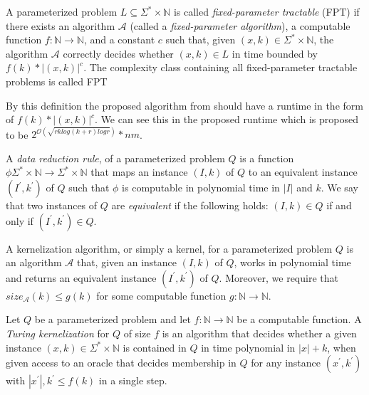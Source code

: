\documentclass[a4paper]{article}
\begin{document}
\begin{theoremdefinition}{\cite[p.~13]{param_algo_book}}
    A parameterized problem $L \subseteq \Sigma^* \times \mathbb{N}$ is called
    \textit{fixed-parameter tractable} (FPT) if there exists an algorithm $\mathcal{A}$ (called
    a \textit{fixed-parameter algorithm}), a computable function $f:\mathbb{N} \rightarrow \mathbb{N}$,
    and a constant $c$ such that, given $(x,k) \in \Sigma^* \times \mathbb{N}$, the algorithm
    $\mathcal{A}$ correctly decides whether $(x,k) \in L$ in time bounded by $f(k) * |(x,k)|^c$.
    The complexity class containing all fixed-parameter tractable problems is called FPT
\end{theoremdefinition}

By this definition the proposed algorithm from \cite{fomin_golovach_panolan_2020} should have
a runtime in the form of $f(k) * |(x,k)|^c$. We can see this in the proposed runtime which is
proposed to be $2^{\mathcal{O} (\sqrt{rk log(k+r) logr})}*nm$.

\begin{theoremdefinition}{\cite[p.~18]{param_algo_book}}
    A \textit{data reduction rule}, of a parameterized problem $Q$ is a function
    $\phi \Sigma^* \times \mathbb{N} \rightarrow \Sigma^* \times \mathbb{N}$
    that maps an instance $(I,k)$ of $Q$ to an equivalent
    instance $(I^\prime, k^\prime)$ of $Q$ such that $\phi$ is computable in polynomial time
    in $|I|$ and $k$. We say that two instances of $Q$ are \textit{equivalent} if the following
    holds: $(I,k) \in Q$ if and only if $(I^\prime, k^\prime) \in Q$.
\end{theoremdefinition}

\begin{theoremdefinition}{\cite[p.~18]{param_algo_book} \label{def:kernelization}}
    A kernelization algorithm, or simply a kernel, for a parameterized problem $Q$
    is an algorithm $\mathcal{A}$ that, given an instance $(I,k)$ of $Q$, works in polynomial
    time and returns an equivalent instance $(I^\prime, k^\prime)$ of $Q$. Moreover, we require
    that $size_{\mathcal{A}}(k) \leq g(k)$ for some computable function
    $g: \mathbb{N} \rightarrow \mathbb{N}$.
\end{theoremdefinition}

\begin{theoremdefinition}{\cite[p.~314]{param_algo_book} \label{def:turing-kernelization}}
    Let $Q$ be a parameterized problem and let $f:\mathbb{N} \rightarrow \mathbb{N} $
    be a computable function. A \textit{Turing kernelization} for $Q$ of size $f$ is an
    algorithm that decides whether a given instance $(x,k) \in \Sigma^* \times \mathbb{N}$
    is contained in $Q$ in time polynomial in $|x|+k$, when given access to an oracle
    that decides membership in $Q$ for any instance $(x^\prime, k^\prime)$ with
    $|x^\prime|,k^\prime \leq f(k)$ in a single step.
\end{theoremdefinition}
\end{document}
